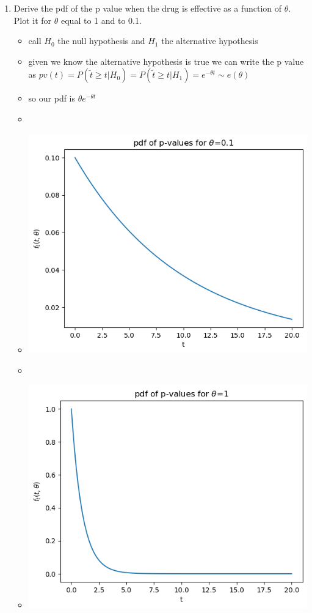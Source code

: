\documentclass[12pt,twoside]{article}
\begin{document}
\begin{enumerate}
\begin{enumerate}
\item Derive the pdf of the p value when the drug is effective as a function of $\theta$. Plot it for $\theta$ equal to 1 and to 0.1.
\begin{itemize}
  \color{blue}
  \item call $H_{0}$ the null hypothesis and $H_{1}$ the alternative hypothesis
  \item given we know the alternative hypothesis is true we can write the p value as $pv(t)=P(\tilde{t}\geq t|H_0)=P(\tilde{t}\geq t|H_1)=e^{-\theta t}\sim e(\theta)$
  \item so our pdf is $\theta e^{-\theta t}$
    \item \inputminted[firstline=27, lastline=43, breaklines=True]{python}{hw7.py}
  \item \includegraphics{homework/homework_7/immages/2a_1.png}
  \item 
  \item \includegraphics{homework/homework_7/immages/2a_2.png}
\end{itemize}


\end{enumerate}
\end{enumerate}
\end{document}
